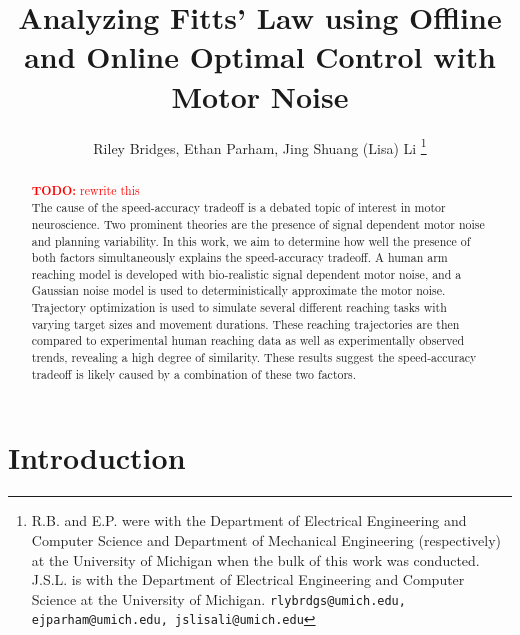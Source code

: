 \documentclass[letterpaper, 10pt, conference]{ieeeconf}
\title{\LARGE \bf Analyzing Fitts' Law using Offline and Online Optimal Control with Motor Noise}
\author{Riley Bridges, Ethan Parham, Jing Shuang (Lisa) Li 
\thanks{R.B. and E.P. were with the Department of Electrical Engineering and Computer Science and Department of Mechanical Engineering (respectively) at the University of Michigan when the bulk of this work was conducted. J.S.L. is with the Department of Electrical Engineering and Computer Science at the University of Michigan. {\tt\small rlybrdgs@umich.edu, ejparham@umich.edu, jslisali@umich.edu}}
}
\newcommand{\todo}[1]{\textcolor{red}{\textbf{TODO:} #1}}
\begin{document}
\maketitle
\thispagestyle{plain}
\pagestyle{plain}

\begin{abstract}
\todo{rewrite this} \\
The cause of the speed-accuracy tradeoff is a debated topic of interest in motor neuroscience. Two prominent theories are the presence of signal dependent motor noise and planning variability. In this work, we aim to determine how well the presence of both factors simultaneously explains the speed-accuracy tradeoff. A human arm reaching model is developed with bio-realistic signal dependent motor noise, and a Gaussian noise model is used to deterministically approximate the motor noise. Trajectory optimization is used to simulate several different reaching tasks with varying target sizes and movement durations. These reaching trajectories are then compared to experimental human reaching data as well as experimentally observed trends, revealing a high degree of similarity. These results suggest the speed-accuracy tradeoff is likely caused by a combination of these two factors.
\end{abstract}

\section{Introduction}
\end{document}
